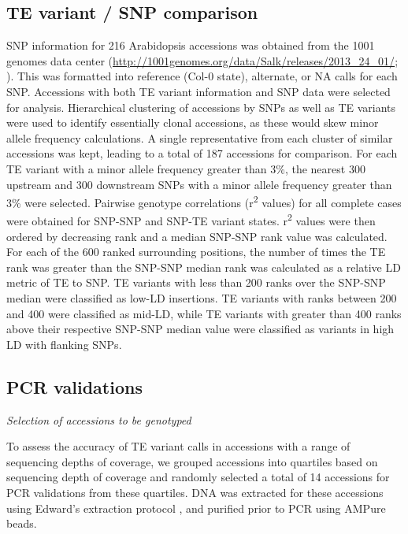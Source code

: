 \documentclass[12pt]{article}
\begin{document}
\subsection{TE variant / SNP comparison}

SNP information for 216 Arabidopsis accessions was obtained from the
1001 genomes data center
(\url{http://1001genomes.org/data/Salk/releases/2013_24_01/}; \cite{Schmitz:2013iu}).
This was formatted into reference (Col-0 state), alternate,
or NA calls for each SNP. Accessions with both TE variant information
and SNP data were selected for analysis. Hierarchical clustering of
accessions by SNPs as well as TE variants were used to identify
essentially clonal accessions, as these would skew minor allele
frequency calculations. A single representative from each cluster of
similar accessions was kept, leading to a total of 187 accessions for
comparison. For each TE variant with a minor allele frequency greater than
3\%, the nearest 300 upstream and 300 downstream SNPs with a minor
allele frequency greater than 3\% were selected. Pairwise genotype
correlations (r\textsuperscript{2} values) for all complete cases were obtained for
SNP-SNP and SNP-TE variant states. r\textsuperscript{2} values were then ordered by
decreasing rank and a median SNP-SNP rank value was calculated. For each
of the 600 ranked surrounding positions, the number of times the TE rank
was greater than the SNP-SNP median rank was calculated as a relative LD
metric of TE to SNP. TE variants with less than 200 ranks over the
SNP-SNP median were classified as low-LD insertions. TE variants with
ranks between 200 and 400 were classified as mid-LD, while TE variants
with greater than 400 ranks above their respective SNP-SNP median value
were classified as variants in high LD with flanking SNPs.

\subsection{PCR validations}

\emph{Selection of accessions to be genotyped}

To assess the accuracy of TE variant calls in accessions with a range of
sequencing depths of coverage, we grouped accessions into quartiles
based on sequencing depth of coverage and randomly selected a total of
14 accessions for PCR validations from these quartiles. DNA was
extracted for these accessions using Edward's extraction protocol
\cite{Edwards:1991wp}, and purified prior to PCR using AMPure beads.
\end{document}

